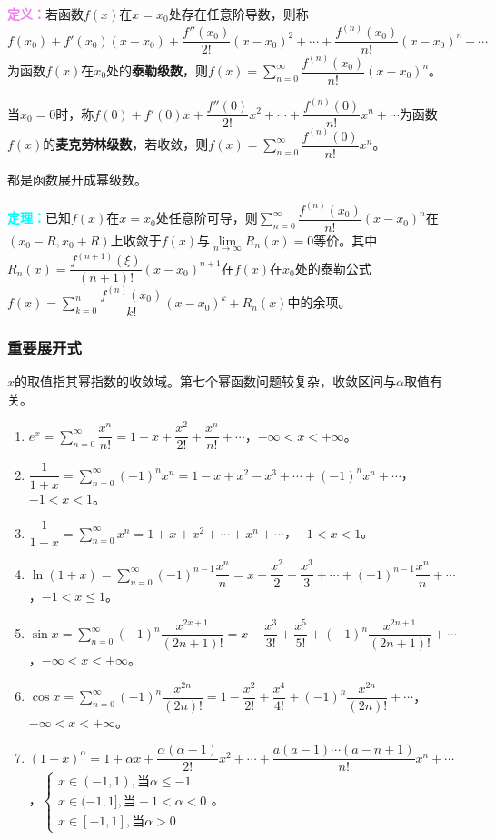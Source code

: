 \documentclass[UTF8, 12pt]{ctexart}
\begin{document}
\textcolor{violet}{\textbf{定义：}}若函数$f(x)$在$x=x_0$处存在任意阶导数，则称$f(x_0)+f'(x_0)(x-x_0)+\dfrac{f''(x_0)}{2!}(x-x_0)^2+\cdots+\dfrac{f^{(n)}(x_0)}{n!}(x-x_0)^n+\cdots$为函数$f(x)$在$x_0$处的\textbf{泰勒级数}，则$f(x)=\sum\limits_{n=0}^\infty\dfrac{f^{(n)}(x_0)}{n!}(x-x_0)^n$。

当$x_0=0$时，称$f(0)+f'(0)x+\dfrac{f''(0)}{2!}x^2+\cdots+\dfrac{f^{(n)}(0)}{n!}x^n+\cdots$为函数$f(x)$的\textbf{麦克劳林级数}，若收敛，则$f(x)=\sum\limits_{n=0}^\infty\dfrac{f^{(n)}(0)}{n!}x^n$。

都是函数展开成幂级数。

\textcolor{aqua}{\textbf{定理：}}已知$f(x)$在$x=x_0$处任意阶可导，则$\sum\limits_{n=0}^\infty\dfrac{f^{(n)}(x_0)}{n!}(x-x_0)^n$在$(x_0-R,x_0+R)$上收敛于$f(x)$与$\lim\limits_{n\to\infty}R_n(x)=0$等价。其中$R_n(x)=\dfrac{f^{(n+1)}(\xi)}{(n+1)!}(x-x_0)^{n+1}$在$f(x)$在$x_0$处的泰勒公式$f(x)=\sum\limits_{k=0}^n\dfrac{f^{(n)}(x_0)}{k!}(x-x_0)^k+R_n(x)$中的余项。

\subsubsection{重要展开式}

$x$的取值指其幂指数的收敛域。第七个幂函数问题较复杂，收敛区间与$\alpha$取值有关。

\begin{enumerate}
    \item $e^x=\sum\limits_{n=0}^\infty\dfrac{x^n}{n!}=1+x+\dfrac{x^2}{2!}+\dfrac{x^n}{n!}+\cdots$，$-\infty<x<+\infty$。
    \item $\dfrac{1}{1+x}=\sum\limits_{n=0}^\infty(-1)^nx^n=1-x+x^2-x^3+\cdots+(-1)^nx^n+\cdots$，$-1<x<1$。
    \item $\dfrac{1}{1-x}=\sum\limits_{n=0}^\infty x^n=1+x+x^2+\cdots+x^n+\cdots$，$-1<x<1$。
    \item $\ln(1+x)=\sum\limits_{n=0}^\infty(-1)^{n-1}\dfrac{x^n}{n}=x-\dfrac{x^2}{2}+\dfrac{x^3}{3}+\cdots+(-1)^{n-1}\dfrac{x^n}{n}+\cdots$，$-1<x\leqslant1$。
    \item $\sin x=\sum\limits_{n=0}^\infty(-1)^n\dfrac{x^{2x+1}}{(2n+1)!}=x-\dfrac{x^3}{3!}+\dfrac{x^5}{5!}+(-1)^n\dfrac{x^{2n+1}}{(2n+1)!}+\cdots$，$-\infty<x<+\infty$。
    \item $\cos x=\sum\limits_{n=0}^\infty(-1)^n\dfrac{x^{2n}}{(2n)!}=1-\dfrac{x^2}{2!}+\dfrac{x^4}{4!}+(-1)^n\dfrac{x^{2n}}{(2n)!}+\cdots$，$-\infty<x<+\infty$。
    \item $(1+x)^\alpha=1+\alpha x+\dfrac{\alpha(\alpha-1)}{2!}x^2+\cdots+\dfrac{a(a-1)\cdots(a-n+1)}{n!}x^n+\cdots$，$\left\{\begin{array}{l}
        x\in(-1,1),\text{当}\alpha\leqslant-1 \\
        x\in(-1,1],\text{当}-1<\alpha<0 \\
        x\in[-1,1],\text{当}\alpha>0
    \end{array}\right.$。
\end{enumerate}
\end{document}
